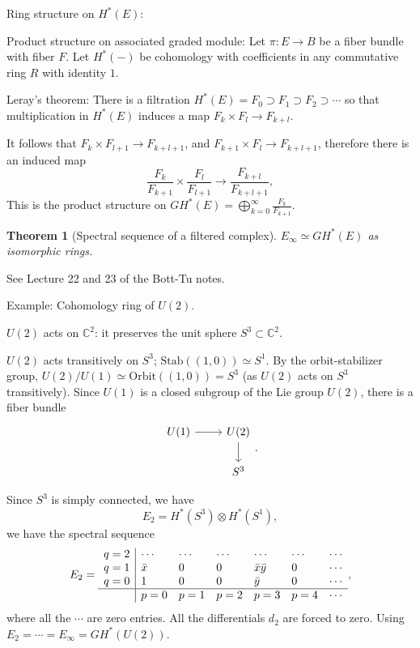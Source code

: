 \documentclass{article}
\theoremstyle{mystyle}
\newtheorem*{theorem*}{Theorem}
\theoremstyle{remark}
\numberwithin{equation}{section}
\begin{document}
Ring structure on $H^*(E)$: 

Product structure on associated graded module: Let $\pi\colon E\rightarrow B$ be a fiber bundle with fiber $F$. Let $H^*(-)$ be cohomology with coefficients in any commutative ring $R$ with identity $1$.

Leray's theorem: There is a filtration $H^*(E) = F_0\supset F_1 \supset F_2\supset \cdots$ so that multiplication in $H^*(E)$ induces a map $F_k\times F_l \rightarrow F_{k+l}$. 

It follows that $F_k\times F_{l+1} \rightarrow F_{k+l+1}$, and $F_{k+1}\times F_l \rightarrow F_{k+l+1}$, therefore there is an induced map
$$\frac{F_k}{F_{k+1}}\times \frac{F_l}{F_{l+1}} \rightarrow \frac{F_{k+l}}{F_{k+l+1}},$$
This is the product structure on $GH^*(E) = \bigoplus_{k=0}^\infty \frac{F_k}{F_{k+1}}$. 

\begin{theorem*}[Spectral sequence of a filtered complex] $E_\infty \simeq GH^*(E)$ as isomorphic rings. 
\end{theorem*}
See Lecture 22 and 23 of the Bott-Tu notes.


Example: Cohomology ring of $U(2)$.

$U(2)$ acts on $\mathbb{C}^2$: it preserves the unit sphere $S^3 \subset \mathbb{C}^2$. 

$U(2)$ acts transitively on $S^3$; $\text{Stab}((1,0))\simeq S^1$. By the orbit-stabilizer group, $U(2)/U(1) \simeq \text{Orbit}((1,0)) = S^3$ (as $U(2)$ acts on $S^3$ transitively). Since $U(1)$ is a closed subgroup of the Lie group $U(2)$, there is a fiber bundle
$$
\begin{tikzcd} U(1) \ar[r] & U(2) \ar[d] \\& S^3
\end{tikzcd}.$$

Since $S^3$ is simply connected, we have
$$E_2 = H^*(S^3)\otimes H^*(S^1),$$
we have the spectral sequence 
$$
E_2 = \begin{array}{l|llllll} q=2 & \cdots & \cdots & \cdots & \cdots & \cdots &\cdots \\
q=1 & \bar{x} & 0 & 0 & \bar{x} \bar{y} & 0 &\cdots \\
q=0 & 1 & 0 & 0 & \bar{y} & 0  &\cdots\\
\hline
& p=0 & p=1 & p=2 & p=3 & p=4  & \cdots  \end{array},
$$
where all the $\cdots$ are zero entries. All the differentials $d_2$ are forced to zero. Using $E_2=\cdots = E_\infty = GH^*(U(2))$.
\end{document}
